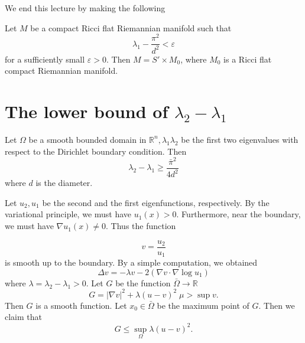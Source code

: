 We end this lecture by making the following
\\

\begin{conjecture}
Let $M$ be a compact Ricci flat Riemannian manifold such that
\[
\lambda_1 - \frac{\pi^2}{d^2} < \varepsilon
\]
for a sufficiently small $\varepsilon > 0$. Then $M = S' \times M_0$, where 
$M_0$ is a Ricci flat compact Riemannian manifold.
\end{conjecture}






\section{The lower bound of $ \lambda_2 - \lambda _1$}\label{Eigenvalue_gap}

Let $ \Omega $ be a smooth bounded domain in $ \mathbb{R}^n , \lambda _1 \lambda _2 $ be the first two eigenvalues with respect to the Dirichlet boundary condition. Then 
%
\[ \lambda _2 - \lambda _1 \geq \frac{\bar{\pi}^2}{4 d ^2} \]
%
where $ d $ is the diameter.

 Let $ u_2, u_1 $ be the second and the first eigenfunctions, respectively. By the variational principle, we must have $ u_1 (x) > 0 $. Furthermore, near the boundary, we must have $ \nabla u_1 (x) \neq 0 $. Thus the function


\[ v = \frac{u_2}{u_1} \]
%
is smooth up to the boundary. By a simple computation, we obtained 
%
\[ \Delta v = - \lambda v - 2 ( \nabla v \cdot \nabla \log u_1) \]
%
where $ \lambda = \lambda _2 - \lambda _1 > 0 $. Let $ G$ be the function $ \bar{\Omega} \rightarrow \mathbb{R}$
%
\[G = |\nabla v | ^2 + \lambda (u - v ) ^2 \; \mu > \sup v. \]
%
Then $ G$ is a smooth function. Let $ x_0 \in \bar{\Omega} $ be the maximum point of $G$. Then we claim that 
%
\[ G \leq \sup_{\Omega} \lambda ( u - v )^2 .\]

